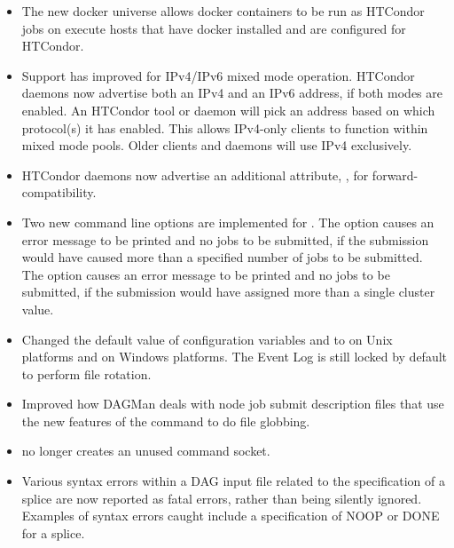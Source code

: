 \begin{itemize}

\item The new docker universe allows docker containers to be run
as HTCondor jobs on execute hosts that have docker installed and are
configured for HTCondor.

\item Support has improved for IPv4/IPv6 mixed mode operation.  
HTCondor daemons now advertise both an IPv4 and an IPv6 address,
if both modes are enabled.  
An HTCondor tool or daemon will pick an address based on which 
protocol(s) it has enabled.  
This allows IPv4-only clients to function within mixed mode pools.
Older clients and daemons will use IPv4 exclusively.

\item HTCondor daemons now advertise an additional attribute,
, for forward-compatibility.

\item Two new command line options are implemented for .
The  option causes an error message to be printed and
no jobs to be submitted,
if the submission would have caused more
than a specified number of jobs to be submitted.
The  option causes an error message to be printed and
no jobs to be submitted,
if the submission would have assigned more than a single cluster value.

\item Changed the default value of configuration variables
 and 
to  on Unix platforms and  on Windows platforms.
The Event Log is still locked by default to perform file rotation.

\item Improved how DAGMan deals with node job submit description files that
use the new features of the  command
to do file globbing.

\item {} no longer creates an unused command socket.

\item Various syntax errors within a DAG input file related to the 
specification of a splice are now reported as fatal errors, 
rather than being silently ignored.
Examples of syntax errors caught include a specification
of NOOP or DONE for a splice.
 


\end{itemize}
